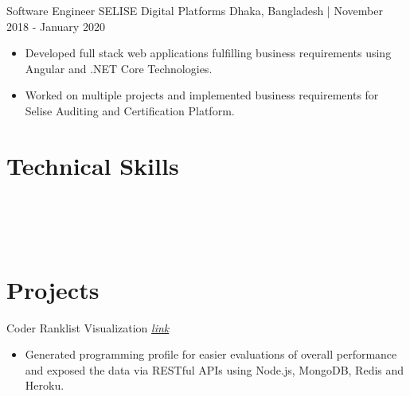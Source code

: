 \documentclass{resumestyle}
\begin{document}
    \vspace{4pt}%


    \worksubsection%
        {Software Engineer}%
        {SELISE Digital Platforms}%
        {Dhaka, Bangladesh | November 2018 - January 2020}%
    
    \begin{itemize}[labelsep=4pt,leftmargin=*,topsep=5pt,partopsep=0pt,itemsep=1pt]%
        \item Developed full stack web applications fulfilling business requirements using Angular and .NET Core Technologies.%
        \item Worked on multiple projects and implemented business requirements for Selise Auditing and Certification Platform.%
    \end{itemize}%

    \vspace{0pt}%

\section{Technical Skills}%
\enspace%
\enspace%
\enspace%
\thinspace\thinspace%
\vspace{4pt}\\%
\enspace%
\enspace%
\enspace%
\vspace{4pt}\\%
\thinspace\thinspace%
\thinspace\thinspace%
\enspace%
\enspace%
\vspace{4pt}\\%
\thinspace\thinspace%
\thinspace\thinspace%
\thinspace\thinspace%
%


\section{Projects}%
    
    \projectsubsection%
        {Coder Ranklist}%
        {Visualization \hfill \textit{\href{https://www.lus.ac.bd/cp__trashed/ranklist/}{\textcolor{link}{link}}}}%
    \begin{itemize}[labelsep=4pt,leftmargin=*,topsep=5pt,partopsep=0pt,itemsep=1pt]%
        \item Generated programming profile for easier evaluations of overall performance and exposed the data via RESTful APIs using Node.js, MongoDB, Redis and Heroku.
    \end{itemize}%
\end{document}
